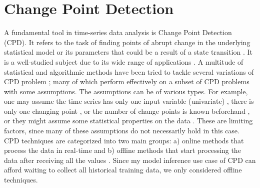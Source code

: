 \section{Change Point Detection}
A fundamental tool in time-series data analysis is Change Point Detection (CPD). It refers to the task of finding points of abrupt change in the underlying statistical model or its parameters that could be a result of a state transition \cite{aminikhanghahi2017survey}. It is a well-studied subject due to its wide range of applications \cite{basseville1993detection}.
A multitude of statistical and algorithmic methods have been tried to tackle several variations of CPD problem \cite{chen2011parametric, hasan2014information, hsu1982bayesian, lee2017implicit, oh2002analyzing, ramos2016anomalies, chowdhury2012bayesian, reeves2007review, rosenfield2010change, wang2011non, xie2013sequential, yamanishi2004line, Lavielle1999}; many of which perform effectively on a subset of CPD problems with some assumptions. The assumptions can be of various types. For example, one may assume the time series has only one input variable (univariate) \cite{fryzlewicz2014wild}, there is only one changing point \cite{bai1998testing}, or the number of change points is known beforehand \cite{lavielle2005using}, or they might assume some statistical properties on the data \cite{chen2011parametric, takeuchi2006unifying, ide2007change}. These are limiting factors, since many of these assumptions do not necessarily hold in this case. CPD techniques are categorized into two main groups: a) online methods that process the data in real-time and b) offline methods that start processing the data after receiving all the values \cite{Truong2018ChangePointSurvey}. Since my model inference use case of CPD can afford waiting to collect all historical training data, we only considered offline techniques. %

